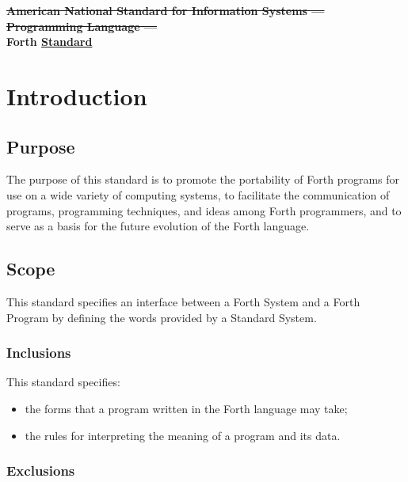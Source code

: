 {\Large\bfseries\cbstart{}
\sout{American National Standard for Information Systems ---} \\[2pt]
\sout{Programming Language ---} \\[2pt]
Forth \uline{\snapshot{} Standard}
\cbend
}

\chapter{Introduction}
\label{chap:intro}

\section{Purpose}
The purpose of this standard is to promote the portability of Forth
programs for use on a wide variety of computing systems, to facilitate
the communication of programs, programming techniques, and ideas among
Forth programmers, and to serve as a basis for the future evolution of
the Forth language.

\section{Scope}
This standard specifies an interface between a Forth System and a
Forth Program by defining the words provided by a Standard System.

\subsection{Inclusions}
This standard specifies:
\begin{itemize}
\item the forms that a program written in the Forth language may take;
\item the rules for interpreting the meaning of a program and its data.
\end{itemize}

\subsection{Exclusions} %
\label{intro:exclusions}

